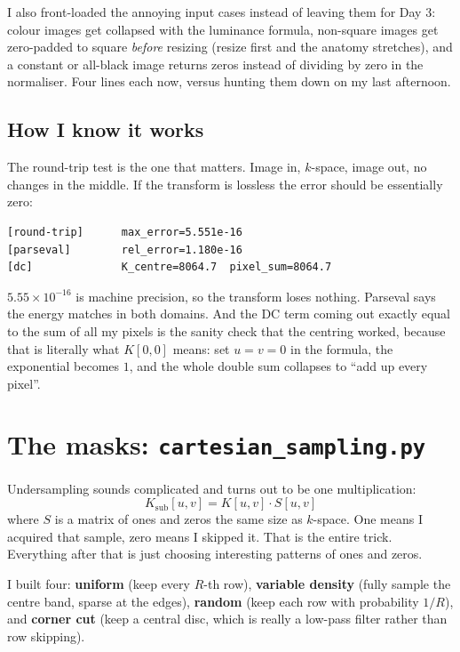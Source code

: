 \documentclass[11pt,a4paper]{article}
\begin{document}
I also front-loaded the annoying input cases instead of leaving them for Day 3:
colour images get collapsed with the luminance formula, non-square images get
zero-padded to square \emph{before} resizing (resize first and the anatomy
stretches), and a constant or all-black image returns zeros instead of dividing
by zero in the normaliser. Four lines each now, versus hunting them down on my
last afternoon.

\subsection*{How I know it works}

The round-trip test is the one that matters. Image in, $k$-space, image out, no
changes in the middle. If the transform is lossless the error should be
essentially zero:

\begin{lstlisting}
[round-trip]      max_error=5.551e-16
[parseval]        rel_error=1.180e-16
[dc]              K_centre=8064.7  pixel_sum=8064.7
\end{lstlisting}

$5.55\times10^{-16}$ is machine precision, so the transform loses nothing.
Parseval says the energy matches in both domains. And the DC term coming out
exactly equal to the sum of all my pixels is the sanity check that the centring
worked, because that is literally what $K[0,0]$ means: set $u=v=0$ in the
formula, the exponential becomes $1$, and the whole double sum collapses to
``add up every pixel''.

\section{The masks: \texttt{cartesian\_sampling.py}}

Undersampling sounds complicated and turns out to be one multiplication:
\[
K_{\text{sub}}[u,v] = K[u,v]\cdot S[u,v]
\]
where $S$ is a matrix of ones and zeros the same size as $k$-space. One means I
acquired that sample, zero means I skipped it. That is the entire trick.
Everything after that is just choosing interesting patterns of ones and zeros.

I built four: \textbf{uniform} (keep every $R$-th row), \textbf{variable density}
(fully sample the centre band, sparse at the edges), \textbf{random} (keep each
row with probability $1/R$), and \textbf{corner cut} (keep a central disc, which
is really a low-pass filter rather than row skipping).
\end{document}
